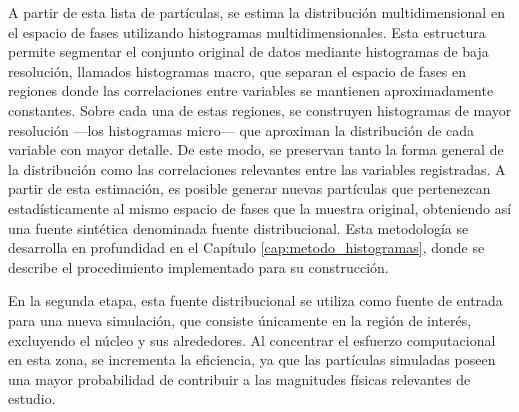 A partir de esta lista de partículas, se estima la distribución multidimensional en el espacio de fases utilizando histogramas multidimensionales. Esta estructura permite segmentar el conjunto original de datos mediante histogramas de baja resolución, llamados histogramas macro, que separan el espacio de fases en regiones donde las correlaciones entre variables se mantienen aproximadamente constantes. Sobre cada una de estas regiones, se construyen histogramas de mayor resolución —los histogramas micro— que aproximan la distribución de cada variable con mayor detalle. De este modo, se preservan tanto la forma general de la distribución como las correlaciones relevantes entre las variables registradas. A partir de esta estimación, es posible generar nuevas partículas que pertenezcan estadísticamente al mismo espacio de fases que la muestra original, obteniendo así una fuente sintética denominada fuente distribucional. Esta metodología se desarrolla en profundidad en el Capítulo \ref{cap:metodo_histogramas}, donde se describe el procedimiento implementado para su construcción.


En la segunda etapa, esta fuente distribucional se utiliza como fuente de entrada para una nueva simulación, que consiste únicamente en la región de interés, excluyendo el núcleo y sus alrededores. Al concentrar el esfuerzo computacional en esta zona, se incrementa la eficiencia, ya que las partículas simuladas poseen una mayor probabilidad de contribuir a las magnitudes físicas relevantes de estudio.



